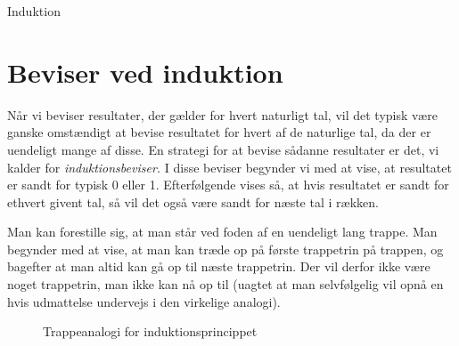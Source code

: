 \begin{center}
\Huge
Induktion
\end{center}

\section*{Beviser ved induktion}

Når vi beviser resultater, der gælder for hvert naturligt tal, vil det typisk være ganske omstændigt at bevise resultatet for hvert af de naturlige tal, da der er uendeligt mange af disse. En strategi for at bevise sådanne resultater er det, vi kalder for \textit{induktionsbeviser.} I disse beviser begynder vi med at vise, at resultatet er sandt for typisk 0 eller 1. Efterfølgende vises så, at hvis resultatet er sandt for ethvert givent tal, så vil det også være sandt for næste tal i rækken. 

Man kan forestille sig, at man står ved foden af en uendeligt lang trappe. Man begynder med at vise, at man kan træde op på første trappetrin på trappen, og bagefter at man altid kan gå op til næste trappetrin. Der vil derfor ikke være noget trappetrin, man ikke kan nå op til (uagtet at man selvfølgelig vil opnå en hvis udmattelse undervejs i den virkelige analogi).

\begin{figure}[H]
	\centering
	\caption{Trappeanalogi for induktionsprincippet}
	\label{fig:induktionstrappe}
\end{figure}

